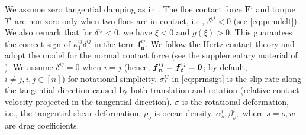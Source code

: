 \documentclass[a4paper,11pt]{article}
\numberwithin{equation}{section}
\theoremstyle{definition}
\newcommand{\bfn}{\boldsymbol{n}}
\newcommand{\bft}{\boldsymbol{t}}
\newcommand{\bff}{\boldsymbol{f}}
\newcommand{\bfF}{\boldsymbol{F}}
\begin{document}
We assume zero tangential damping as in \cite{cundall1979discrete,damsgaard2018application}. The floe contact force $\bfF^i$ and torque $T^i$ are non-zero only when two floes are in contact, i.e., $\delta^{ij}<0$ (see \eqref{eq:prmdelt}).
We also remark that for $\delta^{ij}<0$, we have $\xi<0$ and  $g(\xi)>0$. This guarantees the correct sign of $\kappa^{ij}_1 \delta^{ij}$ in the term $\bff_{\bfn}^{ij}$. 
We follow the Hertz contact theory \cite{hertz1882ueber,puttock1969elastic} and adopt the model for the normal contact force (see the supplementary material of \cite{herman2016discrete}).
 We assume $\delta^{ij}=0$ when $i=j$ (hence, $\bff_{\bfn}^{ij} = \bff_{\bft}^{ij}= \bf0$; by default, $i\ne j, i,j \in [n]$) for notational simplicity. 
$\sigma_t^{ij}$ in \eqref{eq:prmsigt} is the slip-rate along the tangential direction caused by both translation and rotation (relative contact velocity projected in the tangential direction). 
$\sigma$ is the rotational deformation, i.e., the tangential shear deformation. 
$\rho_o$ is ocean density. 
$\alpha^i_s, \beta^i_s,$ where $ s = o, w$ are drag coefficients. 
\end{document}
